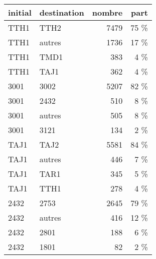 \begin{tabular}{llrr}
\toprule
initial & destination &  nombre & part \\
\midrule
   TTH1 &        TTH2 &    7479 & 75 \% \\
   TTH1 &      autres &    1736 & 17 \% \\
   TTH1 &        TMD1 &     383 &  4 \% \\
   TTH1 &        TAJ1 &     362 &  4 \% \\
   3001 &        3002 &    5207 & 82 \% \\
   3001 &        2432 &     510 &  8 \% \\
   3001 &      autres &     505 &  8 \% \\
   3001 &        3121 &     134 &  2 \% \\
   TAJ1 &        TAJ2 &    5581 & 84 \% \\
   TAJ1 &      autres &     446 &  7 \% \\
   TAJ1 &        TAR1 &     345 &  5 \% \\
   TAJ1 &        TTH1 &     278 &  4 \% \\
   2432 &        2753 &    2645 & 79 \% \\
   2432 &      autres &     416 & 12 \% \\
   2432 &        2801 &     188 &  6 \% \\
   2432 &        1801 &      82 &  2 \% \\
\bottomrule
\end{tabular}
